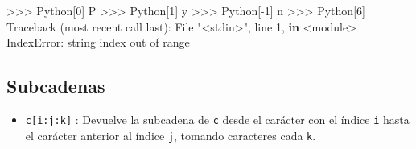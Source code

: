 \documentclass[
  spanish,
  a4paper,
]{scrreport}
\newenvironment{Shaded}{\begin{snugshade}}{\end{snugshade}}
\newcommand{\BuiltInTok}[1]{\textcolor[rgb]{0.00,0.23,0.31}{#1}}
\newcommand{\CommentTok}[1]{\textcolor[rgb]{0.37,0.37,0.37}{#1}}
\newcommand{\DecValTok}[1]{\textcolor[rgb]{0.68,0.00,0.00}{#1}}
\newcommand{\KeywordTok}[1]{\textcolor[rgb]{0.00,0.23,0.31}{\textbf{#1}}}
\newcommand{\NormalTok}[1]{\textcolor[rgb]{0.00,0.23,0.31}{#1}}
\newcommand{\OperatorTok}[1]{\textcolor[rgb]{0.37,0.37,0.37}{#1}}
\newcommand{\PreprocessorTok}[1]{\textcolor[rgb]{0.68,0.00,0.00}{#1}}
\newcommand{\StringTok}[1]{\textcolor[rgb]{0.13,0.47,0.30}{#1}}
\providecommand{\tightlist}{%
  \setlength{\itemsep}{0pt}\setlength{\parskip}{0pt}}
\begin{document}
\begin{Shaded}
\begin{Highlighting}[]
\OperatorTok{\textgreater{}\textgreater{}\textgreater{}} \StringTok{\textquotesingle{}Python\textquotesingle{}}\NormalTok{[}\DecValTok{0}\NormalTok{]}
\CommentTok{\textquotesingle{}P\textquotesingle{}}
\OperatorTok{\textgreater{}\textgreater{}\textgreater{}} \StringTok{\textquotesingle{}Python\textquotesingle{}}\NormalTok{[}\DecValTok{1}\NormalTok{]}
\CommentTok{\textquotesingle{}y\textquotesingle{}}
\OperatorTok{\textgreater{}\textgreater{}\textgreater{}} \StringTok{\textquotesingle{}Python\textquotesingle{}}\NormalTok{[}\OperatorTok{{-}}\DecValTok{1}\NormalTok{]}
\CommentTok{\textquotesingle{}n\textquotesingle{}}
\OperatorTok{\textgreater{}\textgreater{}\textgreater{}} \StringTok{\textquotesingle{}Python\textquotesingle{}}\NormalTok{[}\DecValTok{6}\NormalTok{]}
\NormalTok{Traceback (most recent call last):}
\NormalTok{  File }\StringTok{"\textless{}stdin\textgreater{}"}\NormalTok{, line }\DecValTok{1}\NormalTok{, }\KeywordTok{in} \OperatorTok{\textless{}}\NormalTok{module}\OperatorTok{\textgreater{}}
\PreprocessorTok{IndexError}\NormalTok{: string index out of }\BuiltInTok{range}
\end{Highlighting}
\end{Shaded}

\subsection{Subcadenas}\label{subcadenas}

\begin{itemize}
\tightlist
\item
  \texttt{c{[}i:j:k{]}} : Devuelve la subcadena de \texttt{c} desde el
  carácter con el índice \texttt{i} hasta el carácter anterior al índice
  \texttt{j}, tomando caracteres cada \texttt{k}.
\end{itemize}
\end{document}
